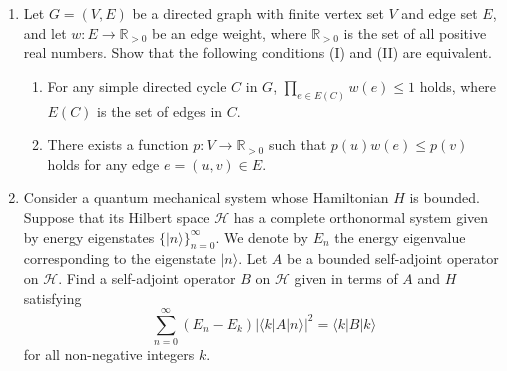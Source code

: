 \documentclass{article}
\begin{document}
\begin{enumerate}[label=\fbox{\arabic*}]
        Let the evaluation relation $(\_) \Downarrow (\_) \subseteq \mathsf{Term} \times \mathsf{Term}$ be the smallest binary relation on $\mathsf{Term}$ satisfying the following six rules:
        \[
          \frac{}{\mathbf{K} \Downarrow \mathbf{K}} \qquad \frac{}{\mathbf{W} \Downarrow \mathbf{W}} \qquad \frac{M \Downarrow \mathbf{K}}{(M \, N) \Downarrow (\mathbf{K} \, N)} \qquad \frac{M \Downarrow \mathbf{W}}{(M \, N) \Downarrow (\mathbf{W} \, N)}
        \]
        \[
          \frac{M \Downarrow (\mathbf{K} \, L) \quad L \Downarrow V}{(M \, N) \Downarrow V} \qquad \frac{M \Downarrow (\mathbf{W} \, L) \quad ((L \, N) \, N) \Downarrow V}{(M \, N) \Downarrow V},
        \]
        where the rule
        \[
          \frac{A_1 \quad \dots \quad A_n}{B}
        \]
        ($n \ge 0$) means that $B$ holds whenever $A_1, \dots, A_n$ hold. Answer the following questions.
        \begin{enumerate}[label=(\arabic*)]
          \item Give a term $I \in \mathsf{Term}$ such that, for any terms $M, V \in \mathsf{Term}$, $M \Downarrow V$ holds if and only if $(I \, M) \Downarrow V$ holds.
          \item Give a term $M \in \mathsf{Term}$ such that there is no $V \in \mathsf{Term}$ satisfying $M \Downarrow V$.
          \item Let $M, V_1, V_2 \in \mathsf{Term}$. Show that, if both $M \Downarrow V_1$ and $M \Downarrow V_2$ hold, then $V_1$ and $V_2$ are the same term.
        \end{enumerate}

  \item Let $G = (V, E)$ be a directed graph with finite vertex set $V$ and edge set $E$, and let $w: E \to \mathbb{R}_{>0}$ be an edge weight, where $\mathbb{R}_{>0}$ is the set of all positive real numbers. Show that the following conditions (I) and (II) are equivalent.
        \begin{enumerate}[label=(\Roman*)]
          \item For any simple directed cycle $C$ in $G$, $\prod_{e \in E(C)} w(e) \le 1$ holds, where $E(C)$ is the set of edges in $C$.
          \item There exists a function $p: V \to \mathbb{R}_{>0}$ such that $p(u)w(e) \le p(v)$ holds for any edge $e = (u, v) \in E$.
        \end{enumerate}

  \item Consider a quantum mechanical system whose Hamiltonian $H$ is bounded. Suppose that its Hilbert space $\mathcal{H}$ has a complete orthonormal system given by energy eigenstates $\{ |n\rangle \}_{n=0}^\infty$. We denote by $E_n$ the energy eigenvalue corresponding to the eigenstate $|n\rangle$. Let $A$ be a bounded self-adjoint operator on $\mathcal{H}$. Find a self-adjoint operator $B$ on $\mathcal{H}$ given in terms of $A$ and $H$ satisfying
        \[
          \sum_{n=0}^\infty (E_n - E_k) |\langle k | A | n \rangle|^2 = \langle k | B | k \rangle
        \]
        for all non-negative integers $k$.

\end{enumerate}
\end{document}
